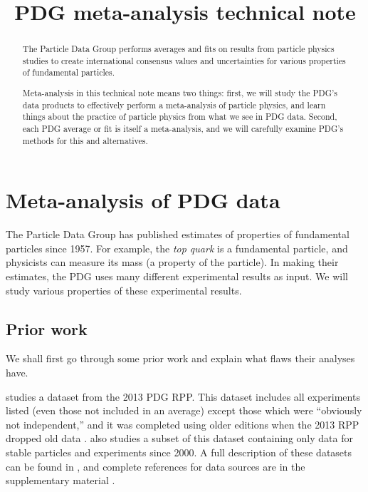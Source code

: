 \documentclass[12pt]{article}
\title{\vspace{-4em}PDG meta-analysis technical note}
\begin{document}
\maketitle

\begin{abstract}
The Particle Data Group performs averages and fits on results from particle physics studies to create international consensus values and uncertainties for various properties of fundamental particles.

Meta-analysis in this technical note means two things: first, we will study the PDG's data products to effectively perform a meta-analysis of particle physics, and learn things about the practice of particle physics from what we see in PDG data. Second, each PDG average or fit is itself a meta-analysis, and we will carefully examine PDG's methods for this and alternatives.
\end{abstract}

\tableofcontents

\section{Meta-analysis of PDG data}

The Particle Data Group has published estimates of properties of fundamental particles since 1957. For example, the \emph{top quark} is a fundamental particle, and physicists can measure its mass (a property of the particle). In making their estimates, the PDG uses many different experimental results as input. We will study various properties of these experimental results.

\subsection{Prior work}

We shall first go through some prior work and explain what flaws their analyses have.

\citet{bailey2017not} studies a dataset from the 2013 PDG RPP. This dataset includes all experiments listed (even those not included in an average) except those which were ``obviously not independent,'' and it was completed using older editions when the 2013 RPP dropped old data \citep[sec.~2.2]{bailey2017not}. \citet{bailey2017not} also studies a subset of this dataset containing only data for stable particles and experiments since 2000. A full description of these datasets can be found in \citet[sec.~2.1-2.3, 3.4]{bailey2017not}, and complete references for data sources are in the supplementary material \citep{bailey2016data}.
\end{document}
